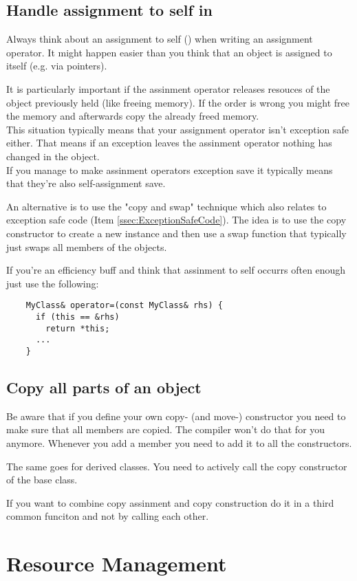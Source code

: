 \documentclass[a4paper, twocolumn]{article}
\let\oldsubsection\subsection
\newcounter{mysubsection}
\renewcommand{\subsection}{
    \stepcounter{mysubsection}
    \oldsubsection
}
\newcommand{\code}[1]{\texttt{\color{black}{#1}}}
\begin{document}
\subsection{Handle assignment to self in \code{operator=}}
Always think about an assignment to self (\code{x = x}) when writing an assignment operator. It might happen easier than you think that an object is assigned to itself (e.g. via pointers).

It is particularly important if the assinment operator releases resouces of the object previously held (like freeing memory). If the order is wrong you might free the memory and afterwards copy the already freed memory.\\
This situation typically means that your assignment operator isn't exception safe either. That means if an exception leaves the assinment operator nothing has changed in the object.\\
If you manage to make assinment operators exception save it typically means that they're also self-assignment save.

An alternative is to use the "copy and swap" technique which also relates to exception safe code (Item \ref{ssec:ExceptionSafeCode}). The idea is to use the copy constructor to create a new instance and then use a swap function that typically just swaps all members of the objects.

If you're an efficiency buff and think that assinment to self occurrs often enough just use the following:
\begin{verbatim}
	MyClass& operator=(const MyClass& rhs) {
	  if (this == &rhs)
	    return *this;
	  ...
	}
\end{verbatim}

\subsection{Copy all parts of an object}
Be aware that if you define your own copy- (and move-) constructor you need to make sure that all members are copied. The compiler won't do that for you anymore. Whenever you add a member you need to add it to all the constructors.

The same goes for derived classes. You need to actively call the copy constructor of the base class.

If you want to combine copy assinment and copy construction do it in a third common funciton and not by calling each other.
\newpage

\section{Resource Management}
\end{document}
